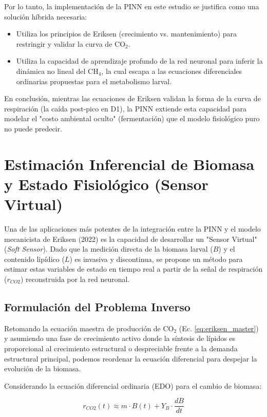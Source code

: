 Por lo tanto, la implementación de la PINN en este estudio se justifica como una solución híbrida necesaria:
\begin{itemize}
    \item Utiliza los principios de Eriksen (crecimiento vs. mantenimiento) para restringir y validar la curva de CO$_2$.
    \item Utiliza la capacidad de aprendizaje profundo de la red neuronal para inferir la dinámica no lineal del CH$_4$, la cual escapa a las ecuaciones diferenciales ordinarias propuestas para el metabolismo larval.
\end{itemize}

En conclusión, mientras las ecuaciones de Eriksen validan la forma de la curva de respiración (la caída post-pico en D1), la PINN extiende esta capacidad para modelar el "costo ambiental oculto" (fermentación) que el modelo fisiológico puro no puede predecir.

\section{Estimación Inferencial de Biomasa y Estado Fisiológico (Sensor Virtual)}

Una de las aplicaciones más potentes de la integración entre la PINN y el modelo mecanicista de Eriksen (2022) es la capacidad de desarrollar un "Sensor Virtual" (\textit{Soft Sensor}). Dado que la medición directa de la biomasa larval ($B$) y el contenido lipídico ($L$) es invasiva y discontinua, se propone un método para estimar estas variables de estado en tiempo real a partir de la señal de respiración ($r_{CO2}$) reconstruida por la red neuronal.

\subsection{Formulación del Problema Inverso}

Retomando la ecuación maestra de producción de CO$_2$ (Ec. \ref{eq:eriksen_master}) y asumiendo una fase de crecimiento activo donde la síntesis de lípidos es proporcional al crecimiento estructural o despreciable frente a la demanda estructural principal, podemos reordenar la ecuación diferencial para despejar la evolución de la biomasa.

Considerando la ecuación diferencial ordinaria (EDO) para el cambio de biomasa:

\begin{equation}
    r_{CO2}(t) \approx m \cdot B(t) + Y_B \cdot \frac{dB}{dt}
\end{equation}

